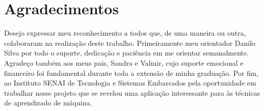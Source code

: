 \thispagestyle{plain}

\section*{Agradecimentos}

\noindent Desejo expressar meu reconhecimento a todos que, de uma maneira ou outra, colaboraram na realização deste trabalho. Primeiramente meu orientador Danilo Silva por todo o suporte, dedicação e paciência em me orientar semanalmente. Agradeço também aos meus pais, Sandra e Valmir, cujo suporte emocional e financeiro foi fundamental durante toda a extensão de minha graduação. Por fim, ao Instituto SENAI de Tecnologia e Sistemas Embarcados pela oportunidade em trabalhar nesse projeto que se revelou uma aplicação interessante para às técnicas de aprendizado de máquina.

\cleardoublepageempty
